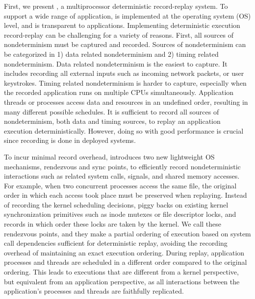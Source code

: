 First, we present \scribe, a multiprocessor deterministic record-replay system.
To support a wide range of application, \scribe is
implemented at the operating system (OS) level, and is transparent to applications.
Implementing deterministic execution record-replay can be challenging for a
variety of reasons. First, all sources of nondeterminism must be captured and
recorded.  Sources of nondeterminism can be categorized in 1) data related
nondeterminism and 2) timing related nondeterminism. Data related nondeterminism
is the easiest to capture. It includes recording all external inputs such as
incoming network packets, or user keystrokes. Timing related nondeterminism is
harder to capture, especially when the recorded application runs on multiple
CPUs simultaneously.  Application threads or processes access data and resources
in an undefined order, resulting in many different possible schedules. It is
sufficient to record all sources of nondeterminism, both data and timing
sources, to replay an application execution deterministically.  However, doing
so with good performance is crucial since recording is done in deployed systems.

To incur minimal record overhead, \scribe introduces two new lightweight OS
mechanisms, rendezvous and sync points, to efficiently record nondeterministic
interactions such as related system calls, signals, and shared memory accesses.
For example, when two concurrent processes access the same file, the original
order in which each access took place must be preserved when replaying.  Instead
of recording the kernel scheduling decisions, \scribe piggy backs on existing
kernel synchronization primitives such as inode mutexes or file descriptor
locks, and records in which order these locks are taken by the kernel.  We call
these rendezvous points, and they make a partial ordering of execution based on
system call dependencies sufficient for deterministic replay, avoiding the recording overhead
of maintaining an exact execution ordering.
During replay, application processes and threads are scheduled in a
different order compared to the original ordering. This leads to executions that are
different from a kernel perspective, but equivalent from an application perspective,
as all interactions between the application's processes and threads
are faithfully replicated.

